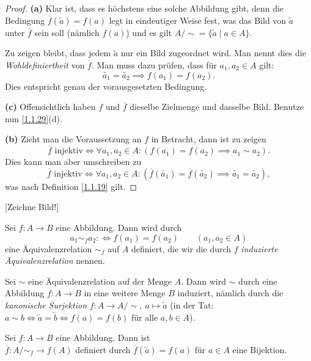 \documentclass[../../main.tex]{subfiles}
\begin{document}
\begin{proof}
{\bf (a)} Klar ist, dass es höchstens eine solche Abbildung gibt,
denn die Bedingung $\overline f(\widetilde a)=f(a)$ legt in eindeutiger
Weise fest, was das Bild von $\widetilde a$ unter $\overline f$ sein soll (nämlich $f(a)$) und es gilt
$A/\text{$\sim$}=\{\widetilde a\mid a\in A\}$.

Zu zeigen bleibt, dass jedem $\widetilde a$ nur ein Bild zugeordnet wird. Man nennt dies die \emph{Wohldefiniertheit}
von $\overline f$. Man muss dazu prüfen, dass für $a_1,a_2\in A$ gilt:
$$\widetilde{a_1}=\widetilde{a_2}\implies f(a_1)=f(a_2).$$
Dies entspricht genau der vorausgesetzten Bedingung.

{\bf (c)} Offensichtlich haben $f$ und $\overline f$ dieselbe Zielmenge
und dasselbe Bild. Benutze nun \ref{1.1.29}(d).

{\bf (b)} Zieht man die Voraussetzung an $f$ in Betracht, dann ist zu zeigen
$$\text{$\overline f$ injektiv}\iff\forall a_1,a_2\in A:(f(a_1)=f(a_2)\implies a_1\sim a_2).$$
Dies kann man aber umschreiben zu
$$\text{$\overline f$ injektiv}\iff\forall a_1,a_2\in A:(\overline f(\widetilde{a_1})=\overline f(\widetilde{a_2})\implies
\widetilde{a_1}=\widetilde{a_2}),$$
was nach Definition \ref{1.1.19} gilt.
\end{proof}

[Zeichne Bild!]

\begin{defprop}\label{1.3.9}
Sei $f\colon A\to B$ eine Abbildung. Dann wird durch
$$a_1\sim_f a_2:\iff f(a_1)=f(a_2)\qquad(a_1,a_2\in A)$$
eine Äquivalenzrelation $\sim_f$ auf $A$ definiert, die wir die durch $f$ \emph{induzierte Äquivalenzrelation} nennen.
\end{defprop}

\begin{bem}\label{1.3.10}
Sei $\sim$ eine Äquivalenzrelation auf der Menge $A$. Dann wird $\sim$ durch eine Abbildung
$f\colon A\to B$ in eine weitere Menge $B$ induziert, nämlich durch die \emph{kanonische Surjektion}
$f\colon A\to A/\text{$\sim$},\ a\mapsto\widetilde a$ (in der Tat: $a\sim b\iff\widetilde a=\widetilde b\iff f(a)=f(b)$ für alle
$a,b\in A$).
\end{bem}

\begin{kor}\label{1.3.11}
Sei $f\colon A\to B$ eine Abbildung. Dann ist\\
$\overline f\colon A/\text{$\sim_f$}\to f(A)$
definiert durch $\overline f(\widetilde a)=f(a)$ für $a\in A$ eine Bijektion.
\end{kor}
\end{document}
